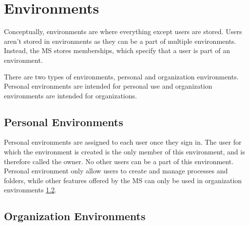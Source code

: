 




\section{Environments}
\label{cha:conceptanddesign:environments}

Conceptually, environments are where everything except users are stored.
Users aren't stored in environments as they can be a part of multiple environments.
Instead, the MS stores memberships, which specify that a user is part of an environment.

There are two types of environments, personal and organization environments.
Personal environments are intended for personal use and organization environments are intended
for organizations.

\subsection{Personal Environments}
\label{cha:conceptanddesign:environments:personal}

Personal environments are assigned to each user once they sign in.
The user for which the environment is created is the only member of this
environment, and is therefore called the owner.
No other users can be a part of this environment.
Personal environment only allow users to create and manage processes and folders,
while other features offered by the MS can only be used in organization environments
\ref{cha:conceptanddesign:environments:organization}.

\subsection{Organization Environments}
\label{cha:conceptanddesign:environments:organization}

